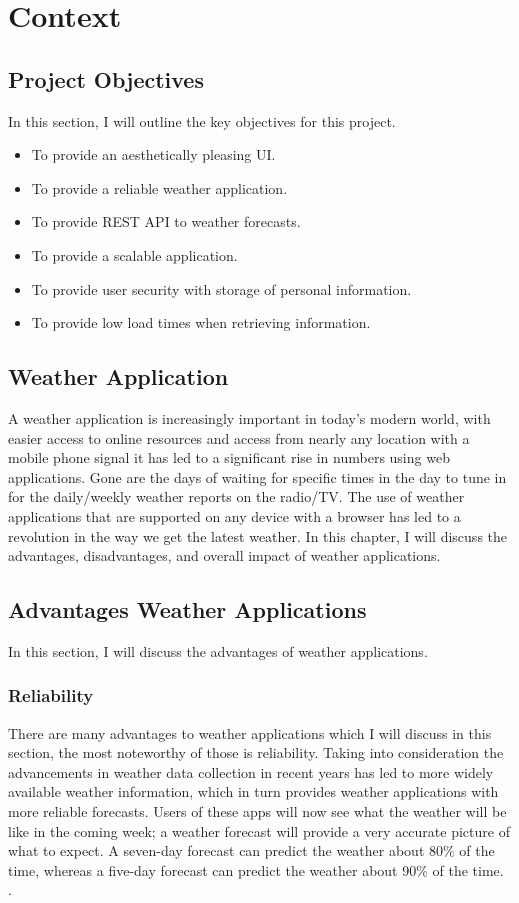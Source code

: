 \chapter{Context}
\section{Project Objectives}
In this section, I will outline the key objectives for this project.
\begin{itemize}
    \item To provide an aesthetically pleasing UI.
    \item To provide a reliable weather application.
    \item To provide REST API to weather forecasts.
    \item To provide a scalable application.
    \item To provide user security with storage of personal information.
    \item To provide low load times when retrieving information.
\end{itemize}

\section{Weather Application}
A weather application is increasingly important in today's modern world, with easier access to online resources and access from nearly any location with a mobile phone signal it has led to a significant rise in numbers using web applications. Gone are the days of waiting for specific times in the day to tune in for the daily/weekly weather reports on the radio/TV. The use of weather applications that are supported on any device with a browser has led to a revolution in the way we get the latest weather. In this chapter, I will discuss the advantages, disadvantages, and overall impact of weather applications.

\section{Advantages Weather Applications}
In this section, I will discuss the advantages of weather applications.

\subsection{Reliability}
There are many advantages to weather applications which I will discuss in this section, the most noteworthy of those is reliability. Taking into consideration the advancements in weather data collection in recent years has led to more widely available weather information, which in turn provides weather applications with more reliable forecasts. Users of these apps will now see what the weather will be like in the coming week; a weather forecast will provide a very accurate picture of what to expect. A seven-day forecast can predict the weather about 80\% of the time, whereas a five-day forecast can predict the weather about 90\% of the time. \cite{weatherReliability}. 

